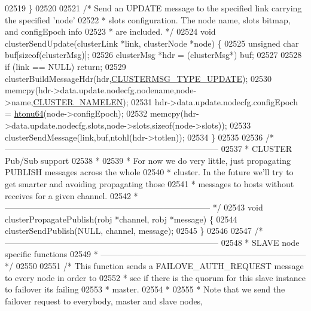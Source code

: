 \begin{DoxyCode}
{{{{{{{{{{{{{{{{{{{{{{{{{{{{{{{{{{{{{{{{02519 \}
02520 
02521 \textcolor{comment}{/* Send an UPDATE message to the specified link carrying the specified 'node'}
02522 \textcolor{comment}{ * slots configuration. The node name, slots bitmap, and configEpoch info}
02523 \textcolor{comment}{ * are included. */}
02524 \textcolor{keywordtype}{void} clusterSendUpdate(clusterLink *link, clusterNode *node) \{
02525     \textcolor{keywordtype}{unsigned} \textcolor{keywordtype}{char} buf[\textcolor{keyword}{sizeof}(clusterMsg)];
02526     clusterMsg *hdr = (clusterMsg*) buf;
02527 
02528     \textcolor{keywordflow}{if} (link == NULL) \textcolor{keywordflow}{return};
02529     clusterBuildMessageHdr(hdr,\hyperlink{cluster_8h_a51dc58bb78128fcae1751d654130ec0f}{CLUSTERMSG\_TYPE\_UPDATE});
02530     memcpy(hdr->data.update.nodecfg.nodename,node->name,\hyperlink{cluster_8h_ace7a882972eff7149675252938643b6e}{CLUSTER\_NAMELEN});
02531     hdr->data.update.nodecfg.configEpoch = \hyperlink{endianconv_8h_a41a6b64ba8dec362f605f615e528fcf3}{htonu64}(node->configEpoch);
02532     memcpy(hdr->data.update.nodecfg.slots,node->slots,\textcolor{keyword}{sizeof}(node->slots));
02533     clusterSendMessage(link,buf,ntohl(hdr->totlen));
02534 \}
02535 
02536 \textcolor{comment}{/* -----------------------------------------------------------------------------}
02537 \textcolor{comment}{ * CLUSTER Pub/Sub support}
02538 \textcolor{comment}{ *}
02539 \textcolor{comment}{ * For now we do very little, just propagating PUBLISH messages across the whole}
02540 \textcolor{comment}{ * cluster. In the future we'll try to get smarter and avoiding propagating those}
02541 \textcolor{comment}{ * messages to hosts without receives for a given channel.}
02542 \textcolor{comment}{ * -------------------------------------------------------------------------- */}
02543 \textcolor{keywordtype}{void} clusterPropagatePublish(robj *channel, robj *message) \{
02544     clusterSendPublish(NULL, channel, message);
02545 \}
02546 
02547 \textcolor{comment}{/* -----------------------------------------------------------------------------}
02548 \textcolor{comment}{ * SLAVE node specific functions}
02549 \textcolor{comment}{ * -------------------------------------------------------------------------- */}
02550 
02551 \textcolor{comment}{/* This function sends a FAILOVE\_AUTH\_REQUEST message to every node in order to}
02552 \textcolor{comment}{ * see if there is the quorum for this slave instance to failover its failing}
02553 \textcolor{comment}{ * master.}
02554 \textcolor{comment}{ *}
02555 \textcolor{comment}{ * Note that we send the failover request to everybody, master and slave nodes,}
}}}}}}}}}}}}}}}}}}}}}}}}}}}}}}}}}}}}}}}}
\end{DoxyCode}
